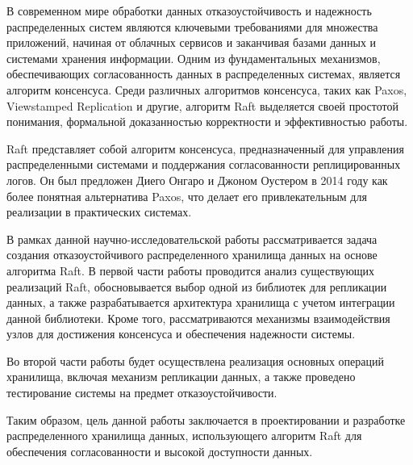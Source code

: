 \introduction

В современном мире обработки данных отказоустойчивость и надежность распределенных
систем являются ключевыми требованиями для множества приложений, начиная от облачных
сервисов и заканчивая базами данных и системами хранения информации. Одним из
фундаментальных механизмов, обеспечивающих согласованность данных в распределенных
системах, является алгоритм консенсуса. Среди различных алгоритмов консенсуса, таких
как Paxos, Viewstamped Replication и другие, алгоритм Raft выделяется своей простотой
понимания, формальной доказанностью корректности и эффективностью работы.

Raft представляет собой алгоритм консенсуса, предназначенный для управления
распределенными системами и поддержания согласованности реплицированных логов.
Он был предложен Диего Онгаро и Джоном Оустером в 2014 году \cite{ongaro2014raft} как более понятная
альтернатива Paxos, что делает его привлекательным для реализации в практических
системах.

В рамках данной научно-исследовательской работы рассматривается задача создания
отказоустойчивого распределенного хранилища данных на основе алгоритма Raft. В первой
части работы проводится анализ существующих реализаций Raft, обосновывается выбор одной
из библиотек для репликации данных, а также разрабатывается архитектура хранилища с
учетом интеграции данной библиотеки. Кроме того, рассматриваются механизмы взаимодействия
узлов для достижения консенсуса и обеспечения надежности системы.

Во второй части работы будет осуществлена реализация основных операций хранилища,
включая механизм репликации данных, а также проведено тестирование системы на предмет
отказоустойчивости.

Таким образом, цель данной работы заключается в проектировании и разработке
распределенного хранилища данных, использующего алгоритм Raft для обеспечения
согласованности и высокой доступности данных.

